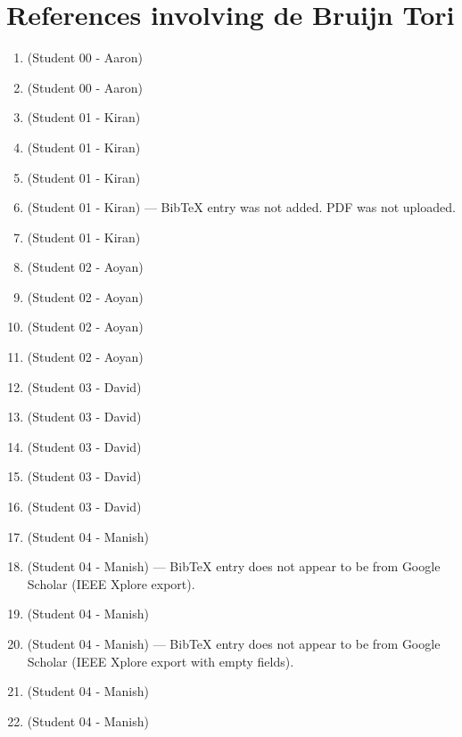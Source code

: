 \documentclass{article}
\begin{document}
\section{References involving de Bruijn Tori}
\label{sec:references}

\begin{enumerate}[label=\#\arabic*,noitemsep,nolistsep]
\item \cite{fan85debruijn} (Student 00 - Aaron)
\item \cite{shiu1997decoding} (Student 00 - Aaron)
\item \cite{gordon1966existence} (Student 01 - Kiran)
\item \cite{nomura1972theory} (Student 01 - Kiran)
\item \cite{ma1984note} (Student 01 - Kiran)
\item \cite{etzion1984construction} (Student 01 - Kiran) --- BibTeX entry was not added. PDF was not uploaded.
\item \cite{etzion2024pseduo} (Student 01 - Kiran)
\item \cite{chung1992universal} (Student 02 - Aoyan)
\item \cite{chee2025hierarchy} (Student 02 - Aoyan)
\item \cite{miyashita2022high} (Student 02 - Aoyan)
\item \cite{ivanyi2011perfect} (Student 02 - Aoyan)
\item \cite{mitchell1994decoding} (Student 03 - David)
\item \cite{reed1962note} (Student 03 - David)
\item \cite{macwilliams1976pseudo} (Student 03 - David)
\item \cite{ivanyi1987d} (Student 03 - David)
\item \cite{bossard2022topological} (Student 03 - David)
\item \cite{tesler2026phased} (Student 04 - Manish)
\item \cite{petriu1993two} (Student 04 - Manish) --- BibTeX entry does not appear to be from Google Scholar (IEEE Xplore export).
\item \cite{lavoie20043d} (Student 04 - Manish)
\item \cite{desjardins2007dense} (Student 04 - Manish) --- BibTeX entry does not appear to be from Google Scholar (IEEE Xplore export with empty fields).
\item \cite{geng2011structured} (Student 04 - Manish)
\item \cite{bardell1986pseudorandom} (Student 04 - Manish)

\end{enumerate}
\end{document}
